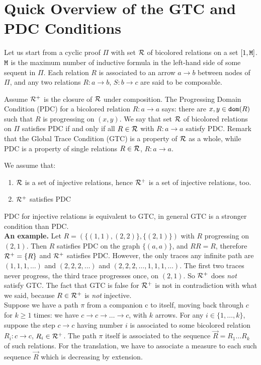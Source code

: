 \documentclass{lmcs}
\begin{document}
\newpage   \section{Quick Overview of the GTC and PDC Conditions}
Let us start from a cyclic proof $\Pi$ with set ${\mathcal R}$ of bicolored relations on a set 
$[1,{\tt M}]$. ${\tt M}$ is the maximum number of inductive formula in the left-hand side 
of some sequent in $\Pi$. Each relation $R$ is associated to an arrow $a \rightarrow b$ 
between nodes of $\Pi$, and any two relations $R:a \rightarrow b$, $S:b \rightarrow c$
are said to be composable.
 
Assume ${\mathcal R}^+$ is the closure of ${\mathcal R}$ under composition. The Progressing Domain 
Condition (PDC) for a bicolored relation $R : a \rightarrow a$ says: 
there are $x, y \in {\tt dom}(R)$ such that $R$ is progressing on $(x,y)$.
We say that set ${\mathcal R}$ of bicolored relations on $\Pi$
satisfies PDC if and only if all $R \in {\mathcal R}$ with $R: a \rightarrow a$ satisfy PDC. 
Remark that the Global Trace Condition (GTC) is a property of ${\mathcal R}$ as a whole, 
while PDC is a property of single relations $R \in {\mathcal R}$, $R:a \rightarrow a$. 

We assume that:

\begin{enumerate}
\item  
${\mathcal R}$ is a set of injective relations, hence ${\mathcal R}^+$ is a set of injective relations, too.
\item
${\mathcal R}^+$ satisfies PDC 
\end{enumerate}

PDC for injective relations is equivalent to GTC, in general GTC is a stronger condition
than PDC. 
\\

{\bf An example.} Let $R = (\{(1,1),(2,2)\},\{(2,1)\})$ with $R$ progressing
on $(2,1)$. Then $R$ satisfies PDC on the graph $\{(a,a)\}$, and $RR=R$, 
therefore  ${\mathcal R}^+=\{R\}$ and ${\mathcal R}^+$ satisfies PDC. However, the only traces any
infinite path are $(1,1,1,\ldots)$ and $(2,2,2,\ldots)$ and $(2,2,2,\ldots,1,1,1,\ldots)$. The
first two traces never progress, the third trace progresses once, on $(2,1)$. So ${\mathcal R}^+$
does \emph{not} satisfy GTC. The fact that GTC is false for ${\mathcal R}^+$ 
is not in contradiction with what we said, because $R \in {\mathcal R}^+$ is  \emph{not} injective.
\\

Suppose we have a path $\pi$ from a companion c to itself, moving back  through $c$
for $k \ge 1$ times: we have $c \rightarrow c \rightarrow \ldots \rightarrow c$, with $k$ arrows.
For any $i \in \{1, \ldots, k\}$, suppose the step $c \rightarrow c$ having number $i$
is associated to some bicolored relation $R_i : c \rightarrow c$, $R_i \in {\mathcal R}^+$. 
The path $\pi$ itself is associated to the sequence $\vec{R} = R_1 \ldots R_k$ of such relations. 
For the translation, we have to associate a measure to each such sequence $\vec{R}$
which is decreasing by extension.
\end{document}
